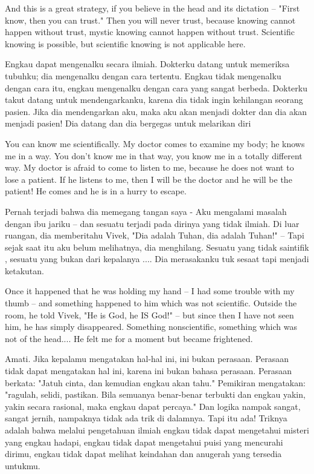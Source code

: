 \english
And this is a great strategy, if you believe in the head and its dictation -- "First know, then you can trust." Then you will never trust, because knowing cannot happen without trust, mystic knowing cannot happen without trust. Scientific knowing is possible, but scientific knowing is not applicable here.

\bahasa
Engkau dapat mengenalku secara ilmiah. Dokterku datang untuk memeriksa tubuhku; dia mengenalku dengan cara tertentu. Engkau tidak mengenalku dengan cara itu, engkau mengenalku dengan cara yang sangat berbeda. Dokterku takut datang untuk mendengarkanku, karena dia tidak ingin kehilangan seorang pasien. Jika dia mendengarkan aku, maka aku akan menjadi dokter dan dia akan menjadi pasien! Dia datang dan dia bergegas untuk melarikan diri

\english
You can know me scientifically. My doctor comes to examine my body; he knows me in a way. You don't know me in that way, you know me in a totally different way. My doctor is afraid to come to listen to me, because he does not want to lose a patient. If he listens to me, then I will be the doctor and he will be the patient! He comes and he is in a hurry to escape.

\bahasa
Pernah terjadi bahwa dia memegang tangan saya - Aku mengalami masalah dengan ibu jariku -- dan sesuatu terjadi pada dirinya yang tidak ilmiah. Di luar ruangan, dia memberitahu Vivek, "Dia adalah Tuhan, dia adalah Tuhan!" -- Tapi sejak saat itu aku belum melihatnya, dia menghilang. Sesuatu yang tidak saintifik , sesuatu yang bukan dari kepalanya .... Dia merasakanku tuk sesaat tapi menjadi ketakutan.

\english
Once it happened that he was holding my hand -- I had some trouble with my thumb -- and something happened to him which was not scientific. Outside the room, he told Vivek, "He is God, he IS God!" -- but since then I have not seen him, he has simply disappeared. Something nonscientific, something which was not of the head.... He felt me for a moment but became frightened.

\bahasa
Amati. Jika kepalamu mengatakan hal-hal ini, ini bukan perasaan. Perasaan tidak dapat mengatakan hal ini, karena ini bukan bahasa perasaan. Perasaan berkata: "Jatuh cinta, dan kemudian engkau akan tahu." Pemikiran mengatakan: "ragulah, selidi, pastikan. Bila semuanya benar-benar terbukti dan engkau yakin, yakin secara rasional, maka engkau dapat percaya." Dan logika nampak sangat, sangat jernih, nampaknya tidak ada trik di dalamnya. Tapi itu ada! Triknya adalah bahwa melalui pengetahuan ilmiah engkau tidak dapat mengetahui misteri yang engkau hadapi, engkau tidak dapat mengetahui puisi yang mencurahi dirimu, engkau tidak dapat melihat keindahan dan anugerah yang tersedia untukmu.

